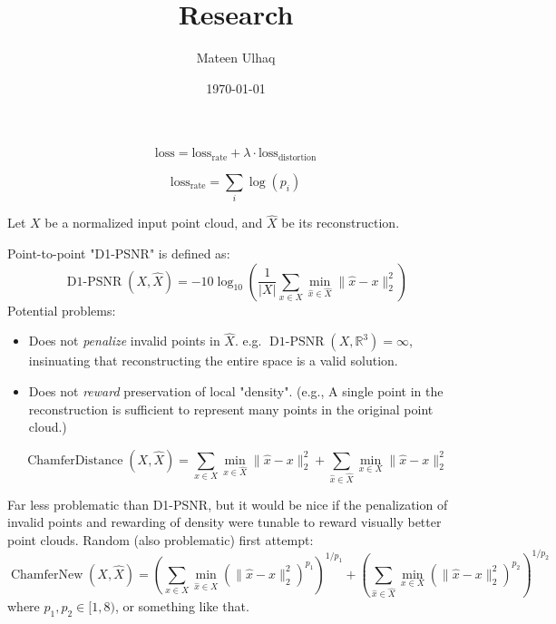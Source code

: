 \documentclass[12pt]{extarticle}
\title{Research}
\author{Mateen Ulhaq}
\date{\today}
\begin{document}
\maketitle

\[ \textrm{loss} = \textrm{loss}_\textrm{rate} + \lambda \cdot
\textrm{loss}_\textrm{distortion} \]

\[ \textrm{loss}_\textrm{rate} = \sum_i \log(p_i) \]

\noindent
\hrulefill

\noindent
Let $X$ be a normalized input point cloud, and $\hat{X}$ be its reconstruction.

\noindent
\hrulefill

\noindent
Point-to-point "D1-PSNR" is defined as:
\[
  \operatorname{D1-PSNR}(X, \hat{X})
  = -10 \log_{10} \left(
    \frac{1}{|X|} \sum_{x \in X} \min_{\hat{x} \in \hat{X}} \lVert \hat{x} - x \rVert_2^2
  \right)
\]
%
Potential problems:
\begin{itemize}
  \item Does not \emph{penalize} invalid points in $\hat{X}$.
    e.g. $\operatorname{D1-PSNR}(X, \mathbb{R}^3) = \infty$, insinuating that reconstructing the entire space is a valid solution.
  \item Does not \emph{reward} preservation of local "density". (e.g., A single point in the reconstruction is sufficient to represent many points in the original point cloud.)
\end{itemize}

\noindent
\hrulefill

\[
  \operatorname{ChamferDistance}(X, \hat{X})
  = \sum_{x \in X} \min_{\hat{x} \in \hat{X}} \lVert \hat{x} - x \rVert_2^2
  + \sum_{\hat{x} \in \hat{X}} \min_{x \in X} \lVert \hat{x} - x \rVert_2^2
\]

Far less problematic than D1-PSNR, but it would be nice if the penalization of invalid points and rewarding of density were tunable to reward visually better point clouds. Random (also problematic) first attempt:
%
\[
  \operatorname{ChamferNew}(X, \hat{X})
  = \left(
  \sum_{x \in X} \min_{\hat{x} \in \hat{X}} (\lVert \hat{x} - x \rVert_2^2)^{p_1}
  \right)^{1/p_1}
  + \left(
    \sum_{\hat{x} \in \hat{X}} \min_{x \in X} (\lVert \hat{x} - x \rVert_2^2)^{p_2}
  \right)^{1/p_2}
\]
%
where $p_1, p_2 \in [1, 8)$, or something like that.

\hrulefill
\end{document}
